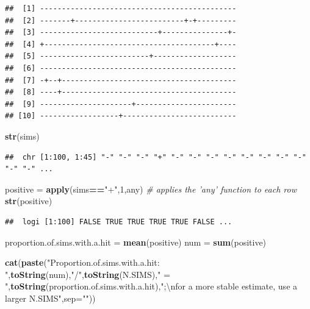 \documentclass[]{book}
\newenvironment{Shaded}{\begin{snugshade}}{\end{snugshade}}
\newcommand{\CharTok}[1]{\textcolor[rgb]{0.31,0.60,0.02}{#1}}
\newcommand{\CommentTok}[1]{\textcolor[rgb]{0.56,0.35,0.01}{\textit{#1}}}
\newcommand{\DataTypeTok}[1]{\textcolor[rgb]{0.13,0.29,0.53}{#1}}
\newcommand{\DecValTok}[1]{\textcolor[rgb]{0.00,0.00,0.81}{#1}}
\newcommand{\KeywordTok}[1]{\textcolor[rgb]{0.13,0.29,0.53}{\textbf{#1}}}
\newcommand{\NormalTok}[1]{#1}
\newcommand{\OperatorTok}[1]{\textcolor[rgb]{0.81,0.36,0.00}{\textbf{#1}}}
\newcommand{\StringTok}[1]{\textcolor[rgb]{0.31,0.60,0.02}{#1}}
\begin{document}
\begin{verbatim}
##  [1] ---------------------------------------------
##  [2] -------+-------------------------+-+---------
##  [3] ---------------------------+---------------+-
##  [4] +---------------------------------------+----
##  [5] -------------------------+-------------------
##  [6] ---------------------------------------------
##  [7] -+--+----------------------------------------
##  [8] ----+----------------------------------------
##  [9] ---------------------+-----------------------
## [10] ------------------+--------------------------
\end{verbatim}

\begin{Shaded}
\begin{Highlighting}[]
\KeywordTok{str}\NormalTok{(sims)}
\end{Highlighting}
\end{Shaded}

\begin{verbatim}
##  chr [1:100, 1:45] "-" "-" "-" "+" "-" "-" "-" "-" "-" "-" "-" "-" "-" "-" ...
\end{verbatim}

\begin{Shaded}
\begin{Highlighting}[]
\NormalTok{positive =}\StringTok{ }\KeywordTok{apply}\NormalTok{(sims}\OperatorTok{==}\StringTok{"+"}\NormalTok{,}\DecValTok{1}\NormalTok{,any)  }\CommentTok{# applies the 'any' function to each row}
\KeywordTok{str}\NormalTok{(positive)}
\end{Highlighting}
\end{Shaded}

\begin{verbatim}
##  logi [1:100] FALSE TRUE TRUE TRUE TRUE FALSE ...
\end{verbatim}

\begin{Shaded}
\begin{Highlighting}[]
\NormalTok{proportion.of.sims.with.a.hit =}\StringTok{ }\KeywordTok{mean}\NormalTok{(positive)}
\NormalTok{num =}\StringTok{ }\KeywordTok{sum}\NormalTok{(positive) }

\KeywordTok{cat}\NormalTok{(}\KeywordTok{paste}\NormalTok{(}\StringTok{"Proportion.of.sims.with.a.hit: "}\NormalTok{,}\KeywordTok{toString}\NormalTok{(num),}\StringTok{"/"}\NormalTok{,}\KeywordTok{toString}\NormalTok{(N.SIMS),}\StringTok{" = "}\NormalTok{,}\KeywordTok{toString}\NormalTok{(proportion.of.sims.with.a.hit),}\StringTok{";}\CharTok{\textbackslash{}n}\StringTok{for a more stable estimate, use a larger N.SIMS"}\NormalTok{,}\DataTypeTok{sep=}\StringTok{""}\NormalTok{))}
\end{Highlighting}
\end{Shaded}
\end{document}
